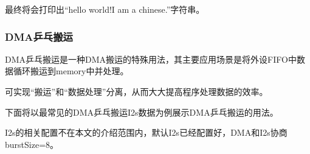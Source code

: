 \documentclass[
  12pt,
]{book}
\begin{document}
最终将会打印出``hello world!I am a chinese.''字符串。

\hypertarget{dmaux4e52ux4e53ux642cux8fd0}{%
\subsubsection{DMA乒乓搬运}\label{dmaux4e52ux4e53ux642cux8fd0}}

DMA乒乓搬运是一种DMA搬运的特殊用法，其主要应用场景是将外设FIFO中数据循环搬运到memory中并处理。

可实现``搬运''和``数据处理''分离，从而大大提高程序处理数据的效率。

下面将以最常见的DMA乒乓搬运I2s数据为例展示DMA乒乓搬运的用法。

I2s的相关配置不在本文的介绍范围内，默认I2s已经配置好，DMA和I2s协商burstSize=8。
\end{document}
